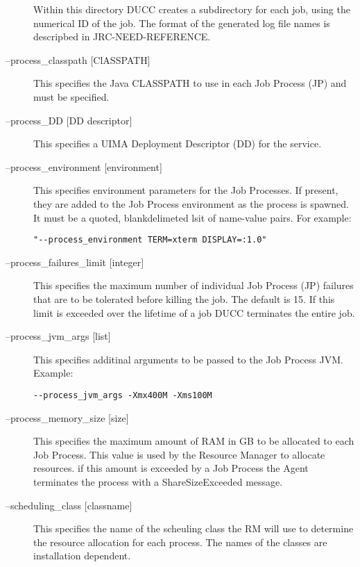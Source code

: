 \begin{description}
             Within this directory DUCC creates a subdirectory for each job, using the numerical 
             ID of the job. The format of the generated log file names is descripbed in JRC-NEED-REFERENCE.

           \item[--process\_classpath {[ClASSPATH]}] This specifies the Java CLASSPATH to use in each
             Job Process (JP) and must be specified.

           \item[--process\_DD {[DD descriptor]}] This specifies a UIMA Deployment Descriptor (DD) for
             the service.

           \item[--process\_environment {[environment]}] This specifies environment parameters for the
             Job Processes. If present, they are added to the Job Process environment as the process is
             spawned. It must be a quoted, blankdelimeted lsit of name-value pairs. For example:
\begin{verbatim}
"--process_environment TERM=xterm DISPLAY=:1.0" 
\end{verbatim}
             
           \item[--process\_failures\_limit {[integer]}] This specifies the maximum number of individual
             Job Process (JP) failures that are to be tolerated before killing the job. The default is
             15. If this limit is exceeded over the lifetime of a job DUCC terminates the entire job.

           \item[--process\_jvm\_args {[list]}] This specifies additinal arguments to be passed to the
             Job Process JVM. Example:

\begin{verbatim}
--process_jvm_args -Xmx400M -Xms100M 
\end{verbatim}
             
           \item[--process\_memory\_size {[size]}] This specifies the maximum amount of RAM in GB to be
             allocated to each Job Process.  This value is used by the Resource Manager to allocate
             resources. if this amount is exceeded by a Job Process the Agent terminates the process
             with a ShareSizeExceeded message.

           \item[--scheduling\_class {[classname]}] This specifies the name of the scheuling class the
             RM will use to determine the resource allocation for each process. The names of the classes
             are installation dependent.


\end{description}
